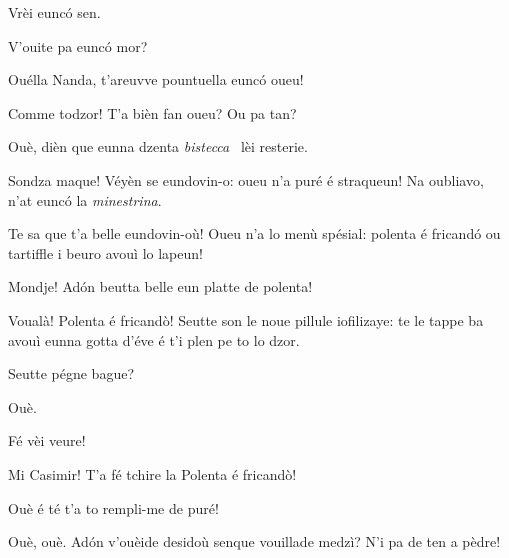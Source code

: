 \begin{drama}
\Casimirspeaks Vrèi eunc\'o sen.




\Fernandaspeaks V'ouite pa eunc\'o mor?

\Casimirspeaks Ouélla Nanda, t’areuvve pountuella eunc\'o oueu!

\Fernandaspeaks Comme todzor! T’a bièn fan oueu? Ou pa tan?

\Casimirspeaks Ouè, dièn que eunna dzenta \textit{bistecca} \bistecca\ lèi resterie.

\Gerominespeaks Sondza maque! Véyèn se eundovin-o: oueu n’a puré é straqueun! Na oubliavo, n’at eunc\'o la \textit{minestrina}.

\Fernandaspeaks Te sa que t’a belle eundovin-où! Oueu n'a lo menù spésial: polenta é fricand\'o ou tartiffle i beuro avouì lo lapeun!

\Casimirspeaks Mondje! Ad\'on beutta belle eun platte de polenta!


\Fernandaspeaks Voualà! Polenta é fricandò! Seutte son le noue pillule iofilizaye: te le tappe ba avouì eunna gotta d'éve é t'i plen pe to lo dzor.

\Casimirspeaks Seutte pégne bague?

\Fernandaspeaks  Ouè.

\Gerominespeaks{} Fé vèi veure!


\Fernandaspeaks Mi Casimir! T’a fé tchire la Polenta é fricandò! 

\Casimirspeaks Ouè é té t'a to rempli-me de puré!

\Fernandaspeaks {} Ouè, ouè. Ad\'on v'ouèide desidoù senque vouillade medzì? N'i pa de ten a pèdre!


\end{drama}
